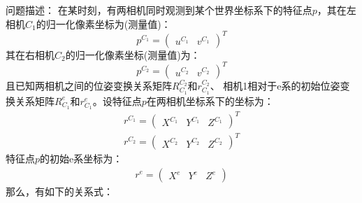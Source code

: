 \documentclass[12pt, twocolumn]{article}
\title{\normf{这是标题}}
\author{\normf{陈烁龙}}
\date{\normf{\today}}
\newcommand{\normf}{\kaishu}
\begin{document}
	
	\maketitle
	\thispagestyle{empty}
	\clearpage
	
	\tableofcontents
	\listoffigures
	\listoftables
	\setcounter{page}{1}
	\clearpage
	\setcounter{page}{1}
	
	\section{\normf{双目相机测量模型}}
	\normf
	问题描述：
	在某时刻，有两相机同时观测到某个世界坐标系下的特征点$p$，其在左相机$C_1$的归一化像素坐标为(测量值)：
	\begin{equation*}
		p^{C_1}=\begin{pmatrix}
			u^{C_1}&v^{C_1}
		\end{pmatrix}^T
	\end{equation*}
	其在右相机$C_2$的归一化像素坐标(测量值)为：
	\begin{equation*}
		p^{C_2}=\begin{pmatrix}
			u^{C_2}&v^{C_2}
		\end{pmatrix}^T
	\end{equation*}
	且已知两相机之间的位姿变换关系矩阵$R_{C_1}^{C_2}$和$r_{C_1}^{C_2}$、	相机1相对于e系的初始位姿变换关系矩阵$R_{C_1}^{e}$和$r_{C_1}^{e}$。设特征点$p$在两相机坐标系下的坐标为：
	\begin{equation*}
		\begin{aligned}
			r^{C_1}=\begin{pmatrix}
				X^{C_1}&Y^{C_1}&Z^{C_1}
			\end{pmatrix}^T\\
		r^{C_2}=\begin{pmatrix}
			X^{C_2}&Y^{C_2}&Z^{C_2}
		\end{pmatrix}^T
		\end{aligned}
	\end{equation*}
	特征点$p$的初始e系坐标为：
	\begin{equation*}
		\begin{aligned}
			r^e=\begin{pmatrix}
				X^{e}&Y^{e}&Z^{e}
			\end{pmatrix}
		\end{aligned}
	\end{equation*}
那么，有如下的关系式：
\end{document}
